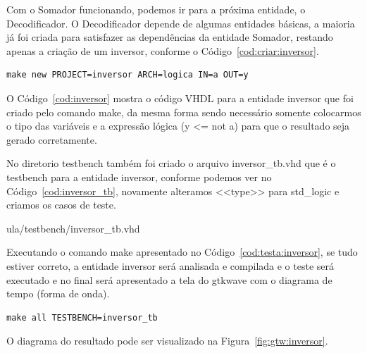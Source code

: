 \documentclass[a4paper,11pt]{report}
\begin{document}
Com o Somador funcionando, podemos ir para a próxima entidade, o Decodificador.
O Decodificador depende de algumas entidades básicas, a maioria já foi criada para satisfazer as dependências da entidade Somador, restando apenas a criação de um inversor, conforme o Código~\ref{cod:criar:inversor}.
\lstset{numbers=left, numberstyle=\tiny, stepnumber=1, numbersep=3pt}
\begin{lstlisting}[label=cod:criar:inversor,caption=Comando para a criar a entidade Inversor.]
  make new PROJECT=inversor ARCH=logica IN=a OUT=y
\end{lstlisting}

O Código~\ref{cod:inversor} mostra o código VHDL para a entidade inversor que foi criado pelo comando make, da mesma forma sendo necessário somente colocarmos o tipo das variáveis e a expressão lógica (y <= not a) para que o resultado seja gerado corretamente.

\lstset{language=VHDL}
\lstset{numbers=left, numberstyle=\tiny, stepnumber=1, numbersep=3pt}


No diretorio testbench também foi criado o arquivo inversor\_tb.vhd que é o testbench para a entidade inversor, conforme podemos ver no Código~\ref{cod:inversor_tb}, novamente alteramos <<type>> para std\_logic e criamos os casos de teste.

\lstset{language=VHDL}
\lstset{numbers=left, numberstyle=\tiny, stepnumber=1, numbersep=3pt}
 {ula/testbench/inversor_tb.vhd}

Executando o comando make apresentado no Código~\ref{cod:testa:inversor}, se tudo estiver correto, a entidade inversor será analisada e compilada e o teste será executado e no final será apresentado a tela do gtkwave com o diagrama de tempo (forma de onda).

\lstset{numbers=left, numberstyle=\tiny, stepnumber=1, numbersep=3pt}
\begin{lstlisting}[label=cod:testa:inversor,caption=Comando para executar o testbench da entidade inversor.]
  make all TESTBENCH=inversor_tb
\end{lstlisting}

O diagrama do resultado pode ser visualizado na Figura~\ref{fig:gtw:inversor}.
\end{document}
